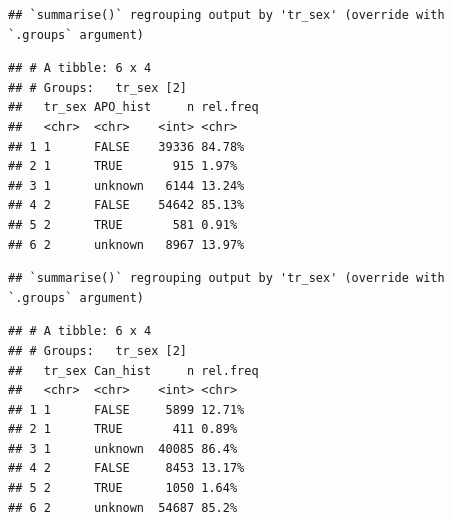 \documentclass[
]{article}
\newenvironment{Shaded}{\begin{snugshade}}{\end{snugshade}}
\newcommand{\DataTypeTok}[1]{\textcolor[rgb]{0.13,0.29,0.53}{#1}}
\newcommand{\DecValTok}[1]{\textcolor[rgb]{0.00,0.00,0.81}{#1}}
\newcommand{\KeywordTok}[1]{\textcolor[rgb]{0.13,0.29,0.53}{\textbf{#1}}}
\newcommand{\NormalTok}[1]{#1}
\newcommand{\OperatorTok}[1]{\textcolor[rgb]{0.81,0.36,0.00}{\textbf{#1}}}
\newcommand{\OtherTok}[1]{\textcolor[rgb]{0.56,0.35,0.01}{#1}}
\newcommand{\StringTok}[1]{\textcolor[rgb]{0.31,0.60,0.02}{#1}}
\begin{document}
\begin{verbatim}
## `summarise()` regrouping output by 'tr_sex' (override with `.groups` argument)
\end{verbatim}

\begin{verbatim}
## # A tibble: 6 x 4
## # Groups:   tr_sex [2]
##   tr_sex APO_hist     n rel.freq
##   <chr>  <chr>    <int> <chr>   
## 1 1      FALSE    39336 84.78%  
## 2 1      TRUE       915 1.97%   
## 3 1      unknown   6144 13.24%  
## 4 2      FALSE    54642 85.13%  
## 5 2      TRUE       581 0.91%   
## 6 2      unknown   8967 13.97%
\end{verbatim}

\begin{Shaded}
\end{Shaded}

\begin{verbatim}
## `summarise()` regrouping output by 'tr_sex' (override with `.groups` argument)
\end{verbatim}

\begin{verbatim}
## # A tibble: 6 x 4
## # Groups:   tr_sex [2]
##   tr_sex Can_hist     n rel.freq
##   <chr>  <chr>    <int> <chr>   
## 1 1      FALSE     5899 12.71%  
## 2 1      TRUE       411 0.89%   
## 3 1      unknown  40085 86.4%   
## 4 2      FALSE     8453 13.17%  
## 5 2      TRUE      1050 1.64%   
## 6 2      unknown  54687 85.2%
\end{verbatim}

\begin{Shaded}
\end{Shaded}
\end{document}
